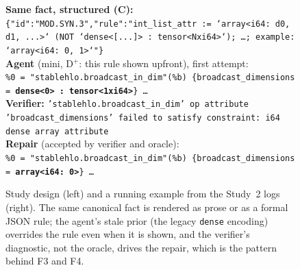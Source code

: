 \begin{figure}[t]
\begin{minipage}[t]{0.58\textwidth}
\textbf{Same fact, structured (C):} \texttt{\{"id":"MOD.SYN.3","rule":"int\_list\_attr := `array<i64: d0, d1, ...>` (NOT `dense<[...]> : tensor<Nxi64>`); \ldots; example: `array<i64: 0, 1>`"\}}\\[2pt]
\textbf{Agent} (mini, D$^+$: this rule shown upfront), first attempt:\\
\texttt{\%0 = "stablehlo.broadcast\_in\_dim"(\%b) \{broadcast\_dimensions = \textbf{dense<0> : tensor<1xi64>}\} \ldots}\\[2pt]
\textbf{Verifier:} \texttt{'stablehlo.broadcast\_in\_dim' op attribute 'broadcast\_dimensions' failed to satisfy constraint: i64 dense array attribute}\\[2pt]
\textbf{Repair} (accepted by verifier and oracle):\\
\texttt{\%0 = "stablehlo.broadcast\_in\_dim"(\%b) \{broadcast\_dimensions = \textbf{array<i64: 0>}\} \ldots}
\end{minipage}
\caption{Study design (left) and a running example from the Study~2 logs (right). The same canonical fact is rendered as prose or as a formal JSON rule; the agent's stale prior (the legacy \texttt{dense} encoding) overrides the rule even when it is shown, and the verifier's diagnostic, not the oracle, drives the repair, which is the pattern behind F3 and F4.}
\label{fig:overview}
\end{figure}
